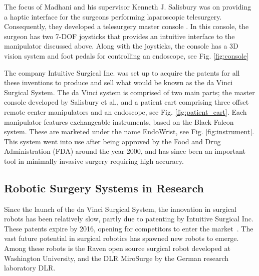 \documentclass[a4paper, 10 pt, conference]{ieeeconf}      %
\begin{document}
The focus of Madhani and his supervisor Kenneth J. Salisbury was on providing a haptic interface for the surgeons performing laparoscopic telesurgery.
Consequently, they developed a telesurgery master console \cite{salisbury2004master}.
In this console, the surgeon has two 7-DOF joysticks that provides an intuitive interface to the manipulator discussed above.
Along with the joysticks, the console has a 3D vision system and foot pedals for controlling an endoscope, see Fig. \ref{fig:console}

The company Intuitive Surgical Inc. was set up to acquire the patents for all these inventions to produce and sell what would be known as the da Vinci Surgical System.
The da Vinci system is comprised of two main parts; the master console developed by Salisbury et al., and a patient cart comprising three offset remote center manipulators and an endoscope, see Fig. \ref{fig:patient_cart}.
Each manipulator features exchangeable instruments, based on the Black Falcon system.
These are marketed under the name EndoWrist, see Fig. \ref{fig:instrument}.
This system went into use after being approved by the Food and Drug Administration (FDA) around the year 2000, and has since been an important tool in minimally invasive surgery requiring high accuracy.

\subsection{Robotic Surgery Systems in Research}
Since the launch of the da Vinci Surgical System, the innovation in surgical robots has been relatively slow, partly due to patenting by Intuitive Surgical Inc. These patents expire by 2016, opening for competitors to enter the market~\cite{intuitivePatents}.
The vast future potential in surgical robotics has spawned new robots to emerge. Among these robots is the Raven open source surgical robot \cite{ravenDesc} developed at Washington University, and the DLR MiroSurge by the German research laboratory DLR.
\end{document}
